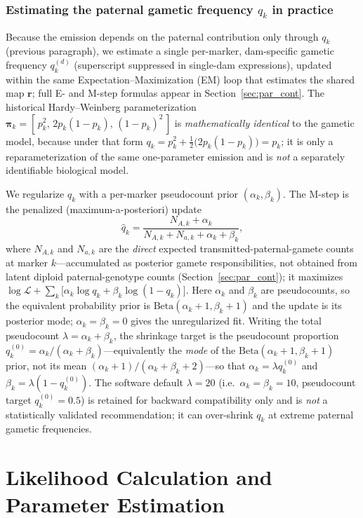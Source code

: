 \documentclass[11pt]{article}
\begin{document}
\subsubsection{Estimating the paternal gametic frequency $q_k$ in practice}
Because the emission depends on the paternal contribution only through $q_k$ (previous paragraph),
we estimate a single per-marker, dam-specific gametic frequency $q_k^{(d)}$ (superscript suppressed
in single-dam expressions), updated within the same Expectation--Maximization (EM) loop
\citep{Dempster1977} that estimates the shared map $\mathbf r$; full E- and M-step formulas appear
in Section~\ref{sec:par_cont}. The historical Hardy--Weinberg
parameterization $\boldsymbol{\pi}_k=[\,p_k^2,\,2p_k(1-p_k),\,(1-p_k)^2\,]$ is
\emph{mathematically identical} to the gametic model, because under that form
$q_k=p_k^2+\tfrac12\bigl(2p_k(1-p_k)\bigr)=p_k$; it is only a reparameterization of the same
one-parameter emission and is \emph{not} a separately identifiable biological model.

We regularize $q_k$ with a per-marker pseudocount prior $(\alpha_k,\beta_k)$. The M-step is the
penalized (maximum-a-posteriori) update
\[
\hat q_k=\frac{N_{A,k}+\alpha_k}{N_{A,k}+N_{a,k}+\alpha_k+\beta_k},
\]
where $N_{A,k}$ and $N_{a,k}$ are the \emph{direct} expected transmitted-paternal-gamete counts at
marker $k$---accumulated as posterior gamete responsibilities, not obtained from latent diploid
paternal-genotype counts (Section~\ref{sec:par_cont}); it maximizes
$\log\mathcal{L}+\sum_k\bigl[\alpha_k\log q_k+\beta_k\log(1-q_k)\bigr]$. Here $\alpha_k$ and
$\beta_k$ are pseudocounts, so the equivalent probability prior is
$\mathrm{Beta}(\alpha_k+1,\beta_k+1)$ and the update is its posterior mode;
$\alpha_k=\beta_k=0$ gives the unregularized fit. Writing the total pseudocount
$\lambda=\alpha_k+\beta_k$, the shrinkage target is the pseudocount proportion
$q^{(0)}_k=\alpha_k/(\alpha_k+\beta_k)$---equivalently the \emph{mode} of the
$\mathrm{Beta}(\alpha_k+1,\beta_k+1)$ prior, not its mean $(\alpha_k+1)/(\alpha_k+\beta_k+2)$---so
that $\alpha_k=\lambda q^{(0)}_k$ and $\beta_k=\lambda(1-q^{(0)}_k)$. The software default
$\lambda=20$ (i.e.\ $\alpha_k=\beta_k=10$, pseudocount target $q^{(0)}_k=0.5$) is retained for
backward compatibility only and is \emph{not} a statistically validated recommendation; it can
over-shrink $q_k$ at extreme paternal gametic frequencies.

\section{Likelihood Calculation and Parameter Estimation}
\end{document}
